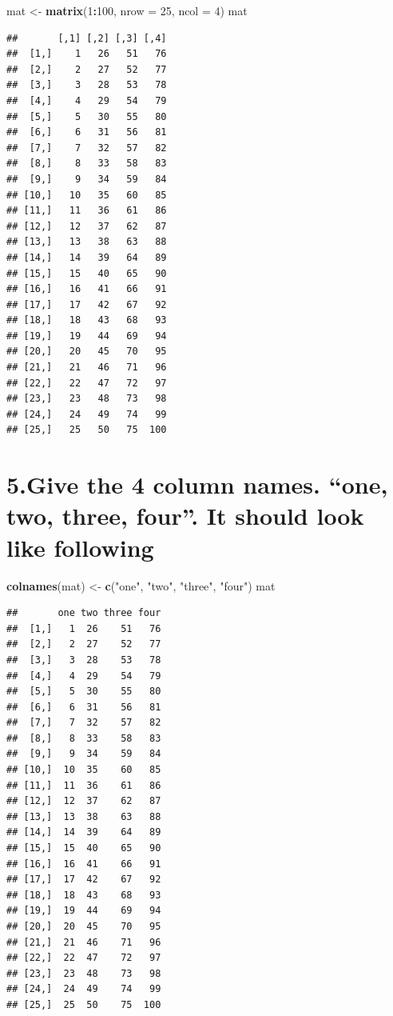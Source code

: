 \documentclass[]{article}
\newenvironment{Shaded}{\begin{snugshade}}{\end{snugshade}}
\newcommand{\DataTypeTok}[1]{\textcolor[rgb]{0.13,0.29,0.53}{#1}}
\newcommand{\DecValTok}[1]{\textcolor[rgb]{0.00,0.00,0.81}{#1}}
\newcommand{\KeywordTok}[1]{\textcolor[rgb]{0.13,0.29,0.53}{\textbf{#1}}}
\newcommand{\NormalTok}[1]{#1}
\newcommand{\OperatorTok}[1]{\textcolor[rgb]{0.81,0.36,0.00}{\textbf{#1}}}
\newcommand{\StringTok}[1]{\textcolor[rgb]{0.31,0.60,0.02}{#1}}
\begin{document}
\begin{Shaded}
\begin{Highlighting}[]
\NormalTok{mat <-}\StringTok{ }\KeywordTok{matrix}\NormalTok{(}\DecValTok{1}\OperatorTok{:}\DecValTok{100}\NormalTok{, }\DataTypeTok{nrow =} \DecValTok{25}\NormalTok{, }\DataTypeTok{ncol =} \DecValTok{4}\NormalTok{)}
\NormalTok{mat}
\end{Highlighting}
\end{Shaded}

\begin{verbatim}
##       [,1] [,2] [,3] [,4]
##  [1,]    1   26   51   76
##  [2,]    2   27   52   77
##  [3,]    3   28   53   78
##  [4,]    4   29   54   79
##  [5,]    5   30   55   80
##  [6,]    6   31   56   81
##  [7,]    7   32   57   82
##  [8,]    8   33   58   83
##  [9,]    9   34   59   84
## [10,]   10   35   60   85
## [11,]   11   36   61   86
## [12,]   12   37   62   87
## [13,]   13   38   63   88
## [14,]   14   39   64   89
## [15,]   15   40   65   90
## [16,]   16   41   66   91
## [17,]   17   42   67   92
## [18,]   18   43   68   93
## [19,]   19   44   69   94
## [20,]   20   45   70   95
## [21,]   21   46   71   96
## [22,]   22   47   72   97
## [23,]   23   48   73   98
## [24,]   24   49   74   99
## [25,]   25   50   75  100
\end{verbatim}

\hypertarget{give-the-4-column-names.-one-two-three-four.-it-should-look-like-following}{%
\section{5.Give the 4 column names. ``one, two, three, four''. It should
look like
following}\label{give-the-4-column-names.-one-two-three-four.-it-should-look-like-following}}

\begin{Shaded}
\begin{Highlighting}[]
\KeywordTok{colnames}\NormalTok{(mat) <-}\StringTok{ }\KeywordTok{c}\NormalTok{(}\StringTok{"one"}\NormalTok{, }\StringTok{"two"}\NormalTok{, }\StringTok{"three"}\NormalTok{, }\StringTok{"four"}\NormalTok{)}
\NormalTok{mat}
\end{Highlighting}
\end{Shaded}

\begin{verbatim}
##       one two three four
##  [1,]   1  26    51   76
##  [2,]   2  27    52   77
##  [3,]   3  28    53   78
##  [4,]   4  29    54   79
##  [5,]   5  30    55   80
##  [6,]   6  31    56   81
##  [7,]   7  32    57   82
##  [8,]   8  33    58   83
##  [9,]   9  34    59   84
## [10,]  10  35    60   85
## [11,]  11  36    61   86
## [12,]  12  37    62   87
## [13,]  13  38    63   88
## [14,]  14  39    64   89
## [15,]  15  40    65   90
## [16,]  16  41    66   91
## [17,]  17  42    67   92
## [18,]  18  43    68   93
## [19,]  19  44    69   94
## [20,]  20  45    70   95
## [21,]  21  46    71   96
## [22,]  22  47    72   97
## [23,]  23  48    73   98
## [24,]  24  49    74   99
## [25,]  25  50    75  100
\end{verbatim}
\end{document}
